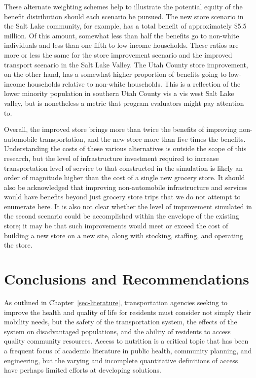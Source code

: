 \documentclass[
  letterpaper,
  authoryear,
  review,
  3p]{elsarticle}
\begin{document}
These alternate weighting schemes help to illustrate the potential
equity of the benefit distribution should each scenario be pursued. The
new store scenario in the Salt Lake community, for example, has a total
benefit of approximately \$5.5 million. Of this amount, somewhat less
than half the benefits go to non-white individuals and less than
one-fifth to low-income households. These ratios are more or less the
same for the store improvement scenario and the improved transport
scenario in the Salt Lake Valley. The Utah County store improvement, on
the other hand, has a somewhat higher proportion of benefits going to
low-income households relative to non-white households. This is a
reflection of the lower minority population in southern Utah County vis
a vis west Salt Lake valley, but is nonetheless a metric that program
evaluators might pay attention to.

Overall, the improved store brings more than twice the benefits of
improving non-automobile transportation, and the new store more than
five times the benefits. Understanding the costs of these various
alternatives is outside the scope of this research, but the level of
infrastructure investment required to increase transportation level of
service to that constructed in the simulation is likely an order of
magnitude higher than the cost of a single new grocery store. It should
also be acknowledged that improving non-automobile infrastructure and
services would have benefits beyond just grocery store trips that we do
not attempt to enumerate here. It is also not clear whether the level of
improvement simulated in the second scenario could be accomplished
within the envelope of the existing store; it may be that such
improvements would meet or exceed the cost of building a new store on a
new site, along with stocking, staffing, and operating the store.


\hypertarget{sec-conclude}{%
\section{Conclusions and Recommendations}\label{sec-conclude}}

As outlined in Chapter~\ref{sec-literature}, transportation agencies
seeking to improve the health and quality of life for residents must
consider not simply their mobility needs, but the safety of the
transportation system, the effects of the system on disadvantaged
populations, and the ability of residents to access quality community
resources. Access to nutrition is a critical topic that has been a
frequent focus of academic literature in public health, community
planning, and engineering, but the varying and incomplete quantitative
definitions of access have perhaps limited efforts at developing
solutions.
\end{document}
